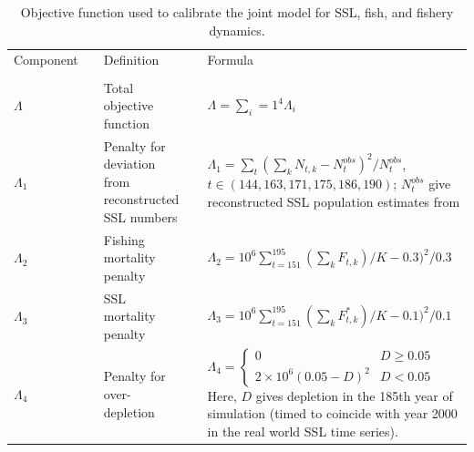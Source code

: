 \documentclass[nonumbib,leqno]{nrc1}
\begin{document}
\begin{table}
\caption{ \large Objective function used to calibrate the joint model for SSL, fish, and
fishery dynamics.}
\label{tab:objfun}
\begin{tabular}{lllll}
\\
\hline \hline
Component & & Definition & & Formula \\
\cline{1-1} \cline{3-3} \cline{5-5}
\\
$\Lambda$ & & Total objective function & & $\Lambda=\sum_i=1^4 \Lambda_i$ \\
$\Lambda_1$ & & Penalty for deviation from reconstructed SSL numbers & & $\Lambda_1= \sum_t (\sum_k N_{t,k}-N_t^{obs})^2/N_t^{obs}$, $t \in (144,163,171,175,186,190)$; $N_t^{obs}$ give reconstructed SSL population estimates from \citet{Goodman2008} \\
$\Lambda_2$ & & Fishing mortality penalty & & $\Lambda_2=10^6 \sum_{t=151}^{195} (\sum_k F_{t,k})/K - 0.3)^2/0.3$ \\
$\Lambda_3$ & & SSL mortality penalty & & $\Lambda_3=10^6 \sum_{t=151}^{195} (\sum_k F_{t,k}^*)/K - 0.1)^2/0.1$ \\
$\Lambda_4$ & & Penalty for over-depletion & & $ \Lambda_4 = \left\{ \begin{array}{cc} 0 &  D \ge 0.05 \\ 2 \times 10^6 (0.05-D)^2 &  D < 0.05 \end{array} \right.$  Here, $D$ gives depletion in the 185th year of simulation (timed to coincide with year 2000 in the real world SSL time series).\\
\bottomrule
\end{tabular}
\vspace{4in}
\end{table}
\end{document}
